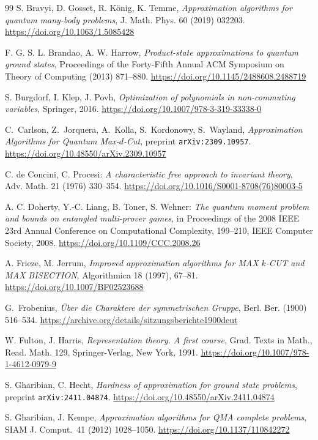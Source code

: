 \documentclass[12pt,dvipsnames,accepted=2016-08-18,a4paper,onecolumn]{quantumarticle}
\numberwithin{equation}{section}
\theoremstyle{definition}
\begin{document}
\begin{thebibliography}{99}
 S. Bravyi, D. Gosset, R. K\"{o}nig, K. Temme, \textit{Approximation
 algorithms for quantum many-body problems}, J. Math. Phys. 60 (2019) 032203.
 \url{https://doi.org/10.1063/1.5085428}

F. G. S. L. Brandao, A. W. Harrow, \textit{Product-state approximations to
 quantum ground states}, Proceedings of the Forty-Fifth Annual ACM Symposium
 on Theory of Computing (2013) 871--880.
 \url{https://doi.org/10.1145/2488608.2488719}

S. Burgdorf, I. Klep, J. Povh,
\textit{Optimization of polynomials in non-commuting variables},
Springer, 2016. \url{https://doi.org/10.1007/978-3-319-33338-0}

C.~Carlson, Z.~Jorquera, A.~Kolla, S.~Kordonowy, S.~Wayland, \textit{Approximation Algorithms for Quantum Max-$d$-Cut},  
preprint \texttt{arXiv:2309.10957}. \url{https://doi.org/10.48550/arXiv.2309.10957}

C. de Concini, C. Procesi: 
\textit{A characteristic free approach to invariant theory}, 
Adv. Math. 21 (1976) 330--354. \url{https://doi.org/10.1016/S0001-8708(76)80003-5}

A. C. Doherty, Y.-C. Liang, B. Toner, S. Wehner: 
\textit{The quantum moment problem and bounds on entangled multi-prover games}, 
in Proceedings of the 2008 IEEE 23rd Annual Conference on Computational Complexity, 199--210, IEEE Computer Society, 2008. \url{https://doi.org/10.1109/CCC.2008.26}

A. Frieze, M. Jerrum, 
\textit{Improved approximation algorithms for MAX $k$-CUT and MAX BISECTION}, 
Algorithmica 18 (1997), 67--81. \url{https://doi.org/10.1007/BF02523688}

G.~Frobenius,
\textit{\"Uber die Charaktere der symmetrischen Gruppe}, 
Berl. Ber. (1900) 516--534. \url{https://archive.org/details/sitzungsberichte1900deut}

W. Fulton, J. Harris, 
{\it Representation theory. A first course},
Grad. Texts in Math., Read. Math. 129,
Springer-Verlag, New York, 1991. \url{https://doi.org/10.1007/978-1-4612-0979-9}

S. Gharibian, C. Hecht, 
\textit{Hardness of approximation for ground state problems},  
preprint \texttt{arXiv:2411.04874}. \url{https://doi.org/10.48550/arXiv.2411.04874}

S. Gharibian, J. Kempe, \textit{Approximation algorithms for QMA
complete problems}, SIAM J. Comput.~41 (2012) 1028--1050. \url{https://doi.org/10.1137/110842272}


\end{thebibliography}
\end{document}
